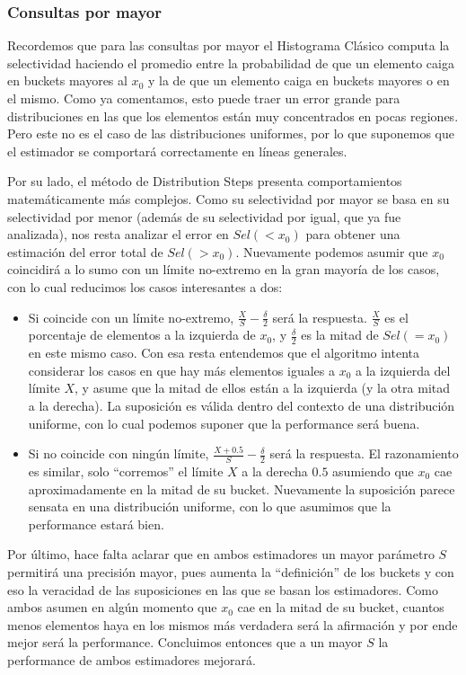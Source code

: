 \subsubsection{Consultas por mayor}
Recordemos que para las consultas por mayor el Histograma Clásico computa la selectividad haciendo el promedio entre la probabilidad de que un elemento caiga en buckets mayores al $x_0$ y la de que un elemento caiga en buckets mayores o en el mismo. Como ya comentamos, esto puede traer un error grande para distribuciones en las que los elementos están muy concentrados en pocas regiones. Pero este no es el caso de las distribuciones uniformes, por lo que suponemos que el estimador se comportará correctamente en líneas generales.

Por su lado, el método de Distribution Steps presenta comportamientos matemáticamente más complejos. Como su selectividad por mayor se basa en su selectividad por menor (además de su selectividad por igual, que ya fue analizada), nos resta analizar el error en $Sel(<x_0)$ para obtener una estimación del error total de $Sel(>x_0)$. Nuevamente podemos asumir que $x_0$ coincidirá a lo sumo con un límite no-extremo en la gran mayoría de los casos, con lo cual reducimos los casos interesantes a dos:
\begin{itemize}
 \item Si coincide con un límite no-extremo, $\frac{X}{S} - \frac{\delta}{2}$ será la respuesta. $\frac{X}{S}$ es el porcentaje de elementos a la izquierda de $x_0$, y $\frac{\delta}{2}$ es la mitad de $Sel(=x_0)$ en este mismo caso. Con esa resta entendemos que el algoritmo intenta considerar los casos en que hay más elementos iguales a $x_0$ a la izquierda del límite $X$, y asume que la mitad de ellos están a la izquierda (y la otra mitad a la derecha). La suposición es válida dentro del contexto de una distribución uniforme, con lo cual podemos suponer que la performance será buena.
 \item Si no coincide con ningún límite, $\frac{X+0.5}{S} - \frac{\delta}{2}$ será la respuesta. El razonamiento es similar, solo ``corremos'' el límite $X$ a la derecha $0.5$ asumiendo que $x_0$ cae aproximadamente en la mitad de su bucket. Nuevamente la suposición parece sensata en una distribución uniforme, con lo que asumimos que la performance estará bien.
\end{itemize}

Por último, hace falta aclarar que en ambos estimadores un mayor parámetro $S$ permitirá una precisión mayor, pues aumenta la ``definición'' de los buckets y con eso la veracidad de las suposiciones en las que se basan los estimadores. Como ambos asumen en algún momento que $x_0$ cae en la mitad de su bucket, cuantos menos elementos haya en los mismos más verdadera será la afirmación y por ende mejor será la performance. Concluimos entonces que a un mayor $S$ la performance de ambos estimadores mejorará.
